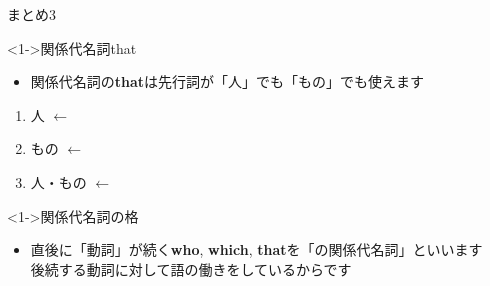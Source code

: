 \documentclass[aspectratio=169,xcolor={dvipsnames,table}]{beamer}
\begin{document}
\begin{frame}[plain]{まとめ3}

\begin{block}<1->{関係代名詞that }
\small
 \begin{itemize}[square]
  \item 関係代名詞の\textbf{that}は先行詞が「人」でも「もの」でも使えます
\end{itemize}

\begin{enumerate}\small
 \item  人\,\,$\longleftarrow$\,\,
 \item  もの\,\,$\longleftarrow$\,\,
 \item  人・もの\,\,$\longleftarrow$\,\,
 \end{enumerate}
     \end{block}

\begin{block}<1->{関係代名詞の格}
\small
 \begin{itemize}[square]
  \item  直後に「動詞」が続く\textbf{who}, \textbf{which}, \textbf{that}を「の関係代名詞」といいます\\
\hfill{\scriptsize 後続する動詞に対して語の働きをしているからです}\raisebox{0pt}{\dbend}\\
\mbox{}
\end{itemize}
     \end{block}

\end{frame}
\end{document}
